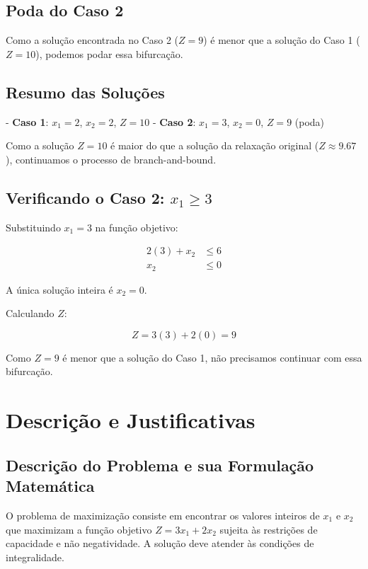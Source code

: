 \documentclass{article}
\begin{document}
\subsection{Poda do Caso 2}

Como a solução encontrada no Caso 2 (\(Z = 9\)) é menor que a solução do Caso 1 (\(Z = 10\)), podemos podar essa bifurcação.

\subsection{Resumo das Soluções}

- \textbf{Caso 1}: \(x_1 = 2\), \(x_2 = 2\), \(Z = 10\)
- \textbf{Caso 2}: \(x_1 = 3\), \(x_2 = 0\), \(Z = 9\) (poda)

Como a solução \(Z = 10\) é maior do que a solução da relaxação original (\(Z \approx 9.67\)), continuamos o processo de branch-and-bound.


\subsection{ Verificando o Caso 2: \(x_1 \geq 3\)}

Substituindo \(x_1 = 3\) na função objetivo:

\begin{align}
2(3) + x_2 & \leq 6 \\
x_2 & \leq 0
\end{align}

A única solução inteira é \(x_2 = 0\).

Calculando \(Z\):

\[
Z = 3(3) + 2(0) = 9
\]

Como \(Z = 9\) é menor que a solução do Caso 1, não precisamos continuar com essa bifurcação.

\section{ Descrição e Justificativas}

\subsection{ Descrição do Problema e sua Formulação Matemática}

O problema de maximização consiste em encontrar os valores inteiros de \(x_1\) e \(x_2\) que maximizam a função objetivo \(Z = 3x_1 + 2x_2\) sujeita às restrições de capacidade e não negatividade. A solução deve atender às condições de integralidade.
\end{document}
